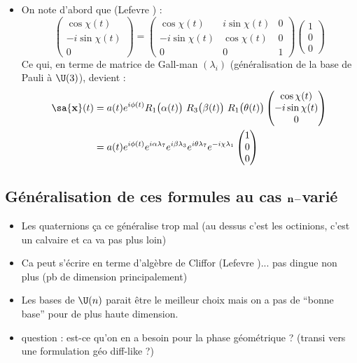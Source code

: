 \begin{itemize}
	\item On note d'abord que (Lefevre \cite{lefevre_polarization_2021}) :
	\[\begin{pmatrix}
		\cos\chi(t) \\ -i\sin\chi(t) \\ 0
	\end{pmatrix} = \begin{pmatrix}
		\cos\chi(t) & i\sin\chi(t) & 0 \\ -i\sin\chi(t) & \cos\chi(t) & 0 \\ 0 & 0 & 1
	\end{pmatrix}\begin{pmatrix}
	1 \\ 0 \\ 0
	\end{pmatrix}\]
	Ce qui, en terme de matrice de Gall-man $(\lambda_i)$ (généralisation de la base de Pauli à $\U(3)$), devient :
	\begin{align*}
		\sa{\bf{x}}(t) &= a(t)e^{i\phi(t)} R_1\big(\alpha(t)\big)\ R_3\big(\beta(t)\big)\ R_1\big(\theta(t)\big)\begin{pmatrix}
			\cos\chi(t) \\ -i\sin\chi(t) \\ 0
		\end{pmatrix} \\
		&= a(t)e^{i\phi(t)} e^{i\alpha \lambda_7} e^{i\beta \lambda_3} e^{i\theta \lambda_7} e^{-i\chi \lambda_1}\begin{pmatrix}
			1 \\ 0 \\ 0
		\end{pmatrix}
	\end{align*}
\end{itemize}

\subsection{Généralisation de ces formules au cas $\bf{n-}$varié}

\begin{itemize}
	\item Les quaternions ça ce généralise trop mal (au dessus c'est les octinions, c'est un calvaire et ca va pas plus loin)
	
	\item Ca peut s'écrire en terme d'algèbre de Cliffor (Lefevre \cite{lefevre_polarization_2021})... pas dingue non plus (pb de dimension principalement)
	
	\item Les bases de $\U(n)$ parait être le meilleur choix mais on a pas de ``bonne base'' pour de plus haute dimension.
	
	\item question : est-ce qu'on en a besoin pour la phase géométrique ? (transi vers une formulation géo diff-like ?)
\end{itemize}





